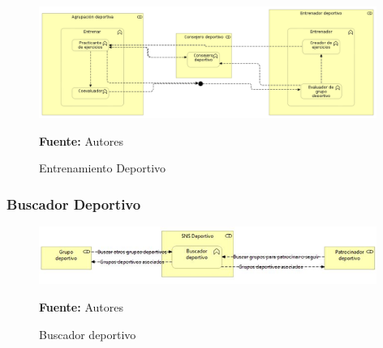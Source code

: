 \begin{figure}[!htb]
  \begin{center}
    \includegraphics[width=11cm]{./imagenes/business_functions/entrenamientodeportivo.png}
    \caption{Entrenamiento Deportivo}
    \label{fig:entrenamiento_deportivo}
    \textbf{Fuente:}  Autores
  \end{center}
\end{figure}

\subsubsection{Buscador Deportivo}

\begin{figure}[!htb]
  \begin{center}
    \includegraphics[width=11cm]{./imagenes/business_functions/buscadordeportivo.png}
    \caption{Buscador deportivo}
    \label{fig:BF_BuscadorDeportivo}
    \textbf{Fuente:}  Autores
  \end{center}
\end{figure}

